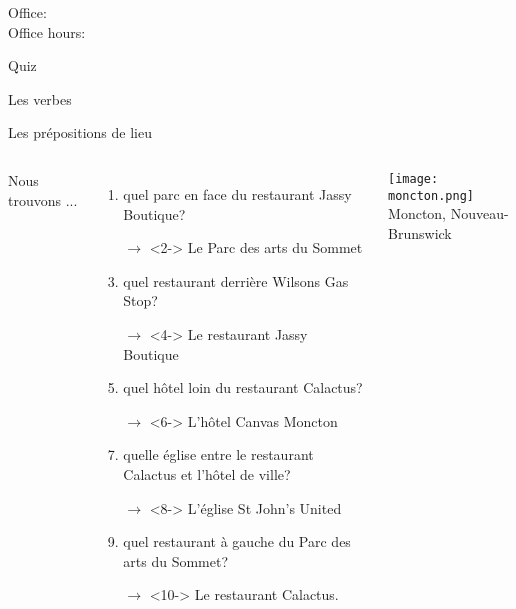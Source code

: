 \documentclass{beamer}
\subtitle[Prépositions et verbes \lexi{-re}]{Les prépositions de lieu et les verbes \lexi{-re}}
\begin{document}
  \begin{frame}
    \titlepage
    \tiny{Office: \\
          Office hours: }
  \end{frame}

  \begin{frame}{}
    \begin{center}
      \Large Quiz
    \end{center}
  \end{frame}

  \begin{frame}{Les verbes }
    \begin{center}
      
    \end{center}
  \end{frame}

  \begin{frame}{Les prépositions de lieu}
    \begin{columns}
        {\scriptsize
        Nous trouvons ...
        \begin{enumerate}
          \item quel parc en face du restaurant Jassy Boutique?
          \item[$\to$]<2-> Le Parc des arts du Sommet
          \item<3-> quel restaurant derrière Wilsons Gas Stop?
          \item[$\to$]<4-> Le restaurant Jassy Boutique
          \item<5-> quel hôtel loin du restaurant Calactus?
          \item[$\to$]<6-> L'hôtel Canvas Moncton
          \item<7-> quelle église entre le restaurant Calactus et l'hôtel de ville?
          \item[$\to$]<8-> L'église St John's United
          \item<9-> quel restaurant à gauche du Parc des arts du Sommet?
          \item[$\to$]<10-> Le restaurant Calactus.
        \end{enumerate}
        }
        \begin{minipage}[c][0.6\textheight]{\linewidth}
          \begin{center}
            \texttt{[image: moncton.png]} \\
            Moncton, Nouveau-Brunswick
          \end{center}
        \end{minipage}
    \end{columns}
  \end{frame}
\end{document}

